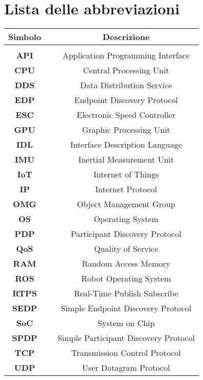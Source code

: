 

\fancyhf{}
\thispagestyle{plain}

\chapter[Lista delle abbreviazioni]{\centering Lista delle abbreviazioni}
\fontsize{14}{14}\selectfont

\begin{center}
\centering
\setlength{\tabcolsep}{15pt}
\fontsize{14}{14}\selectfont
\begin{tabular}{ c c c }
\multicolumn{1}{c}{\Large \textbf{Simbolo}} & & \multicolumn{1}{c}{\Large \textbf{Descrizione}}\\
\hline\hline\\

\textbf{API}  & & Application Programming Interface\\
\textbf{CPU}  & & Central Processing Unit\\
\textbf{DDS}  & & Data Distribution Service\\
\textbf{EDP}  & & Endpoint Discovery Protocol\\
\textbf{ESC}  & & Electronic Speed Controller\\
\textbf{GPU}  & & Graphic Processing Unit\\
\textbf{IDL}  & & Interface Description Language\\
\textbf{IMU}  & & Inertial Measurement Unit\\
\textbf{IoT}  & & Internet of Things\\
\textbf{IP}   & & Internet Protocol\\
\textbf{OMG}  & & Object Management Group\\
\textbf{OS}   & & Operating System\\
\textbf{PDP}  & & Participant Discovery Protocol\\
\textbf{QoS}  & & Quality of Service\\
\textbf{RAM}  & & Random Access Memory\\
\textbf{ROS}  & & Robot Operating System\\
\textbf{RTPS} & & Real-Time Publish Subscribe\\
\textbf{SEDP} & & Simple Endpoint Discovery Protocol\\
\textbf{SoC}  & & System on Chip\\
\textbf{SPDP} & & Simple Participant Discovery Protocol\\
\textbf{TCP}  & & Transmission Control Protocol\\
\textbf{UDP}  & & User Datagram Protocol\\

\end{tabular}
\end{center}

\restoregeometry
